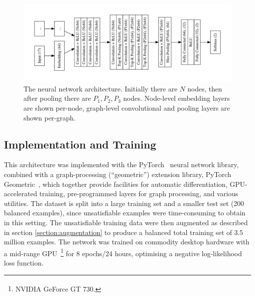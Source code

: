 \documentclass{llncs}
\begin{document}
\begin{figure}
	\centering
	\includegraphics[width=\linewidth]{network}
	\caption{The neural network architecture. Initially there are \(N\) nodes, then after pooling there are \(P_1, P_2, P_3\) nodes. Node-level embedding layers are shown per-node, graph-level convolutional and pooling layers are shown per-graph.}
	\label{figure:network}
\end{figure}

\subsection{Implementation and Training}
This architecture was implemented with the PyTorch~\cite{pytorch} neural network library, combined with a graph-processing (``geometric'') extension library, PyTorch Geometric~\cite{pytorch-geometric}, which together provide facilities for automatic differentiation, GPU-accelerated training, pre-programmed layers for graph processing, and various utilities.
The dataset is split into a large training set and a smaller test set (200 balanced examples), since unsatisfiable examples were time-consuming to obtain in this setting.
The unsatisfiable training data were then augmented as described in section \ref{section:augmentation} to produce a balanced total training set of 3.5 million examples.
The network was trained on commodity desktop hardware with a mid-range GPU~\footnote{NVIDIA\textsuperscript{\textregistered} GeForce\textsuperscript{\textregistered} GT 730.} for 8 epochs/24 hours, optimising a negative log-likelihood loss function.
\end{document}
